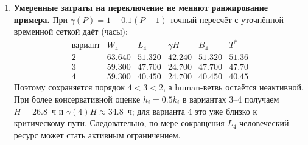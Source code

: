 \documentclass[12pt,a4paper]{article}
\theoremstyle{definition}
\begin{document}
\begin{enumerate}
  \item \textbf{Умеренные затраты на переключение не меняют ранжирование примера.} При $\gamma(P)=1+0.1(P-1)$ точный пересчёт с уточнённой временной сеткой даёт (часы):
  \[
  \begin{array}{c|ccccc}
  \text{вариант} & W_4 & L_4 & \gamma H & B_4 & T^* \\ \hline
  2 & 63.640 & 51.320 & 42.240 & 51.320 & 51.36 \\
  3 & 59.300 & 47.700 & 24.700 & 47.700 & 47.70 \\
  4 & 59.300 & 40.450 & 24.700 & 40.450 & 40.45
  \end{array}
  \]
  Поэтому сохраняется порядок $4<3<2$, а human-ветвь остаётся неактивной. При более консервативной оценке $h_i=0.5k_i$ в вариантах 3--4 получаем $H=26.8$~ч и $\gamma(4)H\approx34.8$~ч; для варианта 4 это уже близко к критическому пути. Следовательно, по мере сокращения $L_4$ человеческий ресурс может стать активным ограничением.
\end{enumerate}
\end{document}
